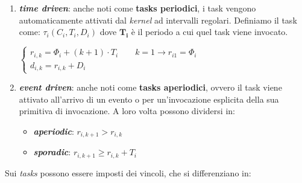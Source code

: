 \begin{enumerate}
    \item \textbf{\textit{time driven}}: anche noti come \textbf{tasks periodici}, i task vengono automaticamente attivati dal \textit{kernel} ad intervalli regolari. Definiamo il task come: $\tau_i(C_i, T_i, D_i)$ dove $\mathbf{T_i}$ è il periodo a cui quel task viene invocato.
    \begin{center}
        \begin{math}
            \begin{cases}
                r_{i,k} = \Phi_i + (k+1) \cdot T_i \qquad k = 1 \rightarrow r_{i1}= \Phi_i \\
                d_{i,k} = r_{i,k} + D_i
            \end{cases}
        \end{math}
    \end{center}

    \item \textbf{\textit{event driven}}: anche noti come \textbf{tasks aperiodici}, ovvero il task viene attivato all'arrivo di un evento o per un'invocazione esplicita della sua primitiva di invocazione. A loro volta possono dividersi in:
    \begin{itemize}
        \item \textbf{\textit{aperiodic}}: $r_{i, k+1} > r_{i, k}$
        \item \textbf{\textit{sporadic}}: $r_{i, k+1} \geq r_{i, k} + T_i$
    \end{itemize}
\end{enumerate}
Sui \textit{tasks} possono essere imposti dei vincoli, che si differenziano in:
